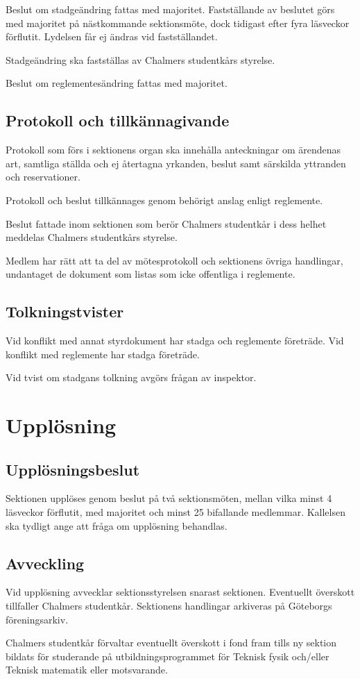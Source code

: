 \documentclass{styrdokument}
\begin{document}
\? Beslut om stadgeändring fattas med  majoritet.
Fastställande av beslutet görs med  majoritet på nästkommande sektionsmöte, dock tidigast efter fyra läsveckor förflutit.
Lydelsen får ej ändras vid fastställandet.
\label{beslut.stadgeandring}

\? Stadgeändring ska fastställas av Chalmers studentkårs styrelse.

\? Beslut om reglementesändring fattas med  majoritet.
\label{beslut.reglementesandring}

\subsection{Protokoll och tillkännagivande} \label{protokoll}

\? Protokoll som förs i sektionens organ ska innehålla anteckningar om ärendenas art, samtliga ställda och ej återtagna yrkanden, beslut samt särskilda yttranden och reservationer.

\? Protokoll och beslut tillkännages genom behörigt anslag enligt reglemente.

\? Beslut fattade inom sektionen som berör Chalmers studentkår i dess helhet meddelas Chalmers studentkårs styrelse.

\? Medlem har rätt att ta del av mötesprotokoll och sektionens övriga handlingar, undantaget de dokument som listas som icke offentliga i reglemente.
\label{ratt.offentlighet}

\subsection{Tolkningstvister}

\? Vid konflikt med annat styrdokument har stadga och reglemente företräde.
Vid konflikt med reglemente har stadga företräde.

\? Vid tvist om stadgans tolkning avgörs frågan av inspektor.

\section{Upplösning}
\subsection{Upplösningsbeslut}

\? Sektionen upplöses genom beslut på två sektionsmöten, mellan vilka minst 4 läsveckor förflutit, med  majoritet och minst 25 bifallande medlemmar.
Kallelsen ska tydligt ange att fråga om upplösning behandlas.
\label{beslut.upplosning}

\subsection{Avveckling}

\? Vid upplösning avvecklar sektionsstyrelsen snarast sektionen.
Eventuellt överskott tillfaller Chalmers studentkår.
Sektionens handlingar arkiveras på Göteborgs föreningsarkiv.

\? Chalmers studentkår förvaltar eventuellt överskott i fond fram tills ny sektion bildats för studerande på utbildningsprogrammet för Teknisk fysik och/eller Teknisk matematik eller motsvarande.
\end{document}
